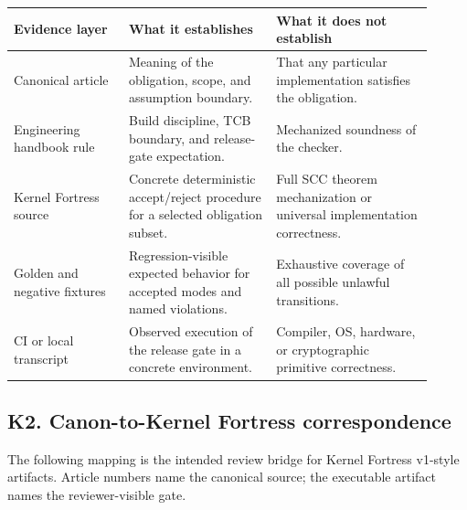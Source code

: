 \documentclass[10pt,oneside]{article}
\theoremstyle{definition}
\theoremstyle{remark}
\begin{document}
\begin{longtable}{@{}p{0.25\linewidth}p{0.32\linewidth}p{0.34\linewidth}@{}}
\toprule
\textbf{Evidence layer} & \textbf{What it establishes} & \textbf{What it does not establish} \\
\midrule
Canonical article & Meaning of the obligation, scope, and assumption boundary. & That any particular implementation satisfies the obligation. \\
Engineering handbook rule & Build discipline, TCB boundary, and release-gate expectation. & Mechanized soundness of the checker. \\
Kernel Fortress source & Concrete deterministic accept/reject procedure for a selected obligation subset. & Full SCC theorem mechanization or universal implementation correctness. \\
Golden and negative fixtures & Regression-visible expected behavior for accepted modes and named violations. & Exhaustive coverage of all possible unlawful transitions. \\
CI or local transcript & Observed execution of the release gate in a concrete environment. & Compiler, OS, hardware, or cryptographic primitive correctness. \\
\bottomrule
\end{longtable}

\subsection*{K2. Canon-to-Kernel Fortress correspondence}
The following mapping is the intended review bridge for Kernel Fortress v1-style artifacts. Article numbers name the canonical source; the executable artifact names the reviewer-visible gate.
\end{document}
